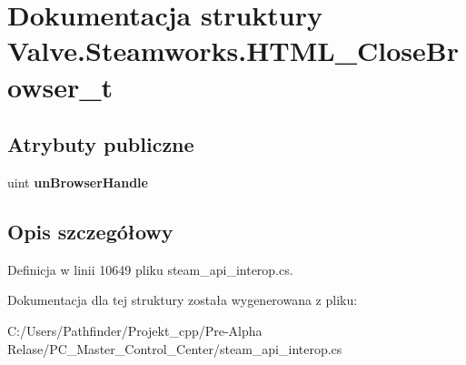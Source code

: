 \hypertarget{struct_valve_1_1_steamworks_1_1_h_t_m_l___close_browser__t}{}\section{Dokumentacja struktury Valve.\+Steamworks.\+H\+T\+M\+L\+\_\+\+Close\+Browser\+\_\+t}
\label{struct_valve_1_1_steamworks_1_1_h_t_m_l___close_browser__t}
\subsection*{Atrybuty publiczne}
\begin{DoxyCompactItemize}
\item 
\mbox{\label{struct_valve_1_1_steamworks_1_1_h_t_m_l___close_browser__t_a72ac3d47ba1b35d31f8e0c670defa646}} 
uint {\bfseries un\+Browser\+Handle}
\end{DoxyCompactItemize}


\subsection{Opis szczegółowy}


Definicja w linii 10649 pliku steam\+\_\+api\+\_\+interop.\+cs.



Dokumentacja dla tej struktury została wygenerowana z pliku\+:\begin{DoxyCompactItemize}
\item 
C\+:/\+Users/\+Pathfinder/\+Projekt\+\_\+cpp/\+Pre-\/\+Alpha Relase/\+P\+C\+\_\+\+Master\+\_\+\+Control\+\_\+\+Center/steam\+\_\+api\+\_\+interop.\+cs\end{DoxyCompactItemize}

